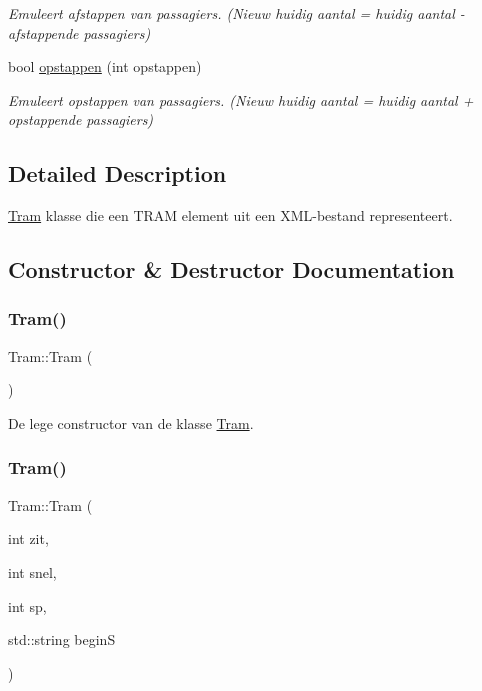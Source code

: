 \begin{DoxyCompactItemize}
\begin{DoxyCompactList}\small\item\em Emuleert afstappen van passagiers. (Nieuw huidig aantal = huidig aantal -\/ afstappende passagiers) \end{DoxyCompactList}\item 
bool \hyperlink{class_tram_aaeb00c535a6854f85dcc42cdff97ad0c}{opstappen} (int opstappen)
\begin{DoxyCompactList}\small\item\em Emuleert opstappen van passagiers. (Nieuw huidig aantal = huidig aantal + opstappende passagiers) \end{DoxyCompactList}\end{DoxyCompactItemize}


\subsection{Detailed Description}
\hyperlink{class_tram}{Tram} klasse die een T\+R\+AM element uit een X\+M\+L-\/bestand representeert. 

\subsection{Constructor \& Destructor Documentation}
\mbox{\label{class_tram_aad83b2e7e79d57528691bf317ab0e1ef}} 
\subsubsection{\texorpdfstring{Tram()}{Tram()}\hspace{0.1cm}{\footnotesize\ttfamily [1/2]}}
{\footnotesize\ttfamily Tram\+::\+Tram (\begin{DoxyParamCaption}{ }\end{DoxyParamCaption})}



De lege constructor van de klasse \hyperlink{class_tram}{Tram}. 

\mbox{\label{class_tram_afef6559a85225dc0b8a9445d6d16cbbb}} 
\subsubsection{\texorpdfstring{Tram()}{Tram()}\hspace{0.1cm}{\footnotesize\ttfamily [2/2]}}
{\footnotesize\ttfamily Tram\+::\+Tram (\begin{DoxyParamCaption}\item[{int}]{zit,  }\item[{int}]{snel,  }\item[{int}]{sp,  }\item[{std\+::string}]{beginS }\end{DoxyParamCaption})}



